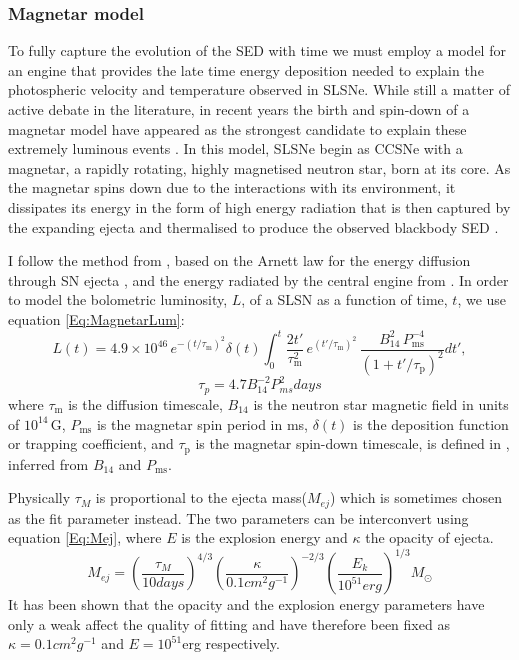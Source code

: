\subsubsection{Magnetar model}
\label{sec:Magnetar}
To fully capture the evolution of the SED with time we must employ a model for an engine that provides the late time energy deposition needed to explain the photospheric velocity and temperature observed in SLSNe. While still a matter of active debate in the literature, in recent years the birth and spin-down of a magnetar model have appeared as the strongest candidate to explain these extremely luminous events \citep{Inserra2013,Nicholl2013}. In this model, SLSNe begin as CCSNe with a magnetar, a rapidly rotating, highly magnetised neutron star, born at its core. As the magnetar spins down due to the interactions with its environment, it dissipates its energy in the form of high energy radiation that is then captured by the expanding ejecta and thermalised to produce the observed blackbody SED \citep{Kasen2009,Woosley2010,Inserra2013}.

I follow the method from \citet{Inserra2013}, based on the Arnett law for the energy diffusion through SN ejecta \citep{Arnett1982}, and the energy radiated by the central engine from \citet{Bildsten2013,Wosley2012}. In order to model the bolometric luminosity, $L$, of a SLSN as a function of time, $t$, we use equation \ref{Eq:MagnetarLum}:
\begin{equation}
L(t) = 4.9\times 10^{46}\,e^{ -(t / \tau_\mathrm{m})^2 }\delta(t) \int_{0}^{t} \frac{2t'}{\tau_\mathrm{m}^2}\,e^{(t'/\tau_\mathrm{m})^2}\,\frac{B_{14}^{2}\,P_{\mathrm{ms}}^{-4}}{\left(1+t'/\tau_\mathrm{p}\right)^2} dt',
\label{Eq:MagnetarLum}
\end{equation}
\begin{equation}
\label{Eq:SDPeriod}
\tau_{p} = 4.7B_{14}^{-2}P_{ms}^{2}days
\end{equation}
\noindent where $\tau_\mathrm{m}$ is the diffusion timescale, $B_{14}$ is the neutron star magnetic field in units of $10^{14}$\,G, $P_{\mathrm{ms}}$ is the magnetar spin period in ms, $\delta(t)$ is the deposition function or trapping coefficient, and $\tau_\mathrm{p}$ is the magnetar spin-down timescale, is defined in , inferred from $B_{14}$ and $P_{\mathrm{ms}}$.

Physically $\tau_M$ is proportional to the ejecta mass($M_{ej}$) which is sometimes chosen as the fit parameter instead. The two parameters can be interconvert using equation \ref{Eq:Mej}, where $E$ is the explosion energy and $\kappa$ the opacity of ejecta.
\begin{equation}
\label{Eq:Mej}
M_{ej} = (\frac{\tau_{M}}{10days})^{4/3}(\frac{\kappa}{0.1cm^2g^{-1}})^{-2/3}(\frac{E_k}{10^{51}erg})^{1/3}M_{\odot}
\end{equation}
\noindent It has been shown \citep{Inserra2013,Inserra2014,Nicoll2015,Papadopuplus2014} that the opacity and the explosion energy parameters have only a weak affect the quality of fitting and have therefore been fixed as $\kappa = 0.1cm^2g^{-1}$ and $E = 10^{51}$erg respectively.

